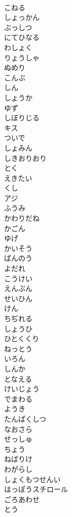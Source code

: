 \documentclass[8pt]{extreport}
\begin{document}
\begin{CJK}{UTF8}{min}
\\	こねる
\\	しょっかん
\\	ぶっしつ
\\	にてひなる
\\	わしょく
\\	りょうしゃ
\\	ぬめり
\\	こんぶ
\\	しん
\\	しょうか
\\	ゆず
\\	しぼりじる
\\	キス
\\	ついで
\\	しょみん
\\	しきおりおり
\\	とく
\\	えきたい
\\	くし
\\	アジ
\\	ふうみ
\\	かわりだね
\\	かごん
\\	ゆげ
\\	かいそう
\\	ばんのう
\\	よだれ
\\	こうけい
\\	えんぶん
\\	せいひん
\\	けん
\\	ちぢれる
\\	しょうひ
\\	ひとくくり
\\	ねっとう
\\	いろん
\\	しんか
\\	となえる
\\	けいじょう
\\	でまわる
\\	ようき
\\	たんぱくしつ
\\	なおさら
\\	せっしゅ
\\	ちょう
\\	ねばりけ
\\	わがらし
\\	しょくもつせんい
\\	はっぽうスチロール
\\	ごろあわせ
\\	とう

\end{CJK}
\end{document}
